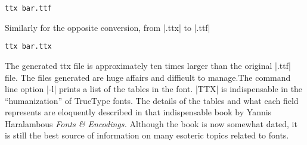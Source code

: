 \begin{verbatim}
ttx bar.ttf
\end{verbatim}

Similarly for the opposite conversion, from |.ttx| to |.ttf|

\begin{verbatim}
ttx bar.ttx
\end{verbatim}

The generated ttx file is approximately ten times larger than the original |.ttf| file. The files generated are huge affairs and difficult to manage.The command line option |-l| prints a list of the tables in the font. |TTX| is indispensable in the ``humanization'' of TrueType fonts. The details of the tables and what each field represents are eloquently described in that indispensable book by Yannis Haralambous \textit{Fonts \& Encodings.} Although the book is now somewhat dated, it is still the best source of information on many esoteric topics related to fonts. 





